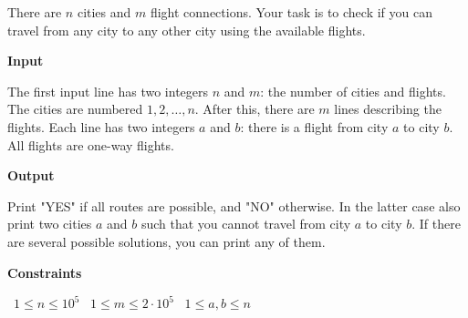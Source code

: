 There are $n$ cities and $m$ flight connections. Your task is to check if you can travel from any city to any other city using the available flights.

\vspace{0.3cm}\noindent\textbf{Input}

The first input line has two integers $n$ and $m$: the number of cities and flights. The cities are numbered $1,2,\dots,n$.
After this, there are $m$ lines describing the flights. Each line has two integers $a$ and $b$: there is a flight from city $a$ to city $b$. All flights are one-way flights.

\vspace{0.3cm}\noindent\textbf{Output}

Print "YES" if all routes are possible, and "NO" otherwise. In the latter case also print two cities $a$ and $b$ such that you cannot travel from city $a$ to city $b$. If there are several possible solutions, you can print any of them.

\vspace{0.3cm}\noindent\textbf{Constraints}

\textbullet\ $1 \le n \le 10^5$
\textbullet\ $1 \le m \le 2 \cdot 10^5$
\textbullet\ $1 \le a,b \le n$